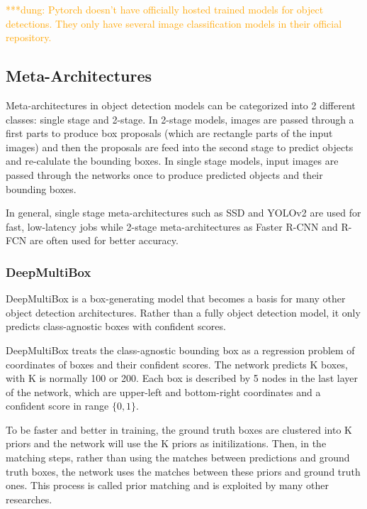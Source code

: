 \documentclass[conference]{IEEEtran}
\newcommand{\alnote}[1]{ {\textcolor{blue} { ***andre: #1 }}}
\newcommand{\dungnote}[1]{ {\textcolor{orange} { ***dung: #1 }}}
\newcommand{\alnote}[1]{}
\newcommand{\dungnote}[1]{}
\begin{document}
\dungnote{Pytorch doesn't have officially hosted trained models for object detections. They only have several image classification models in their official repository.}

\subsection{Meta-Architectures}


Meta-architectures in object detection models can be categorized into 2 different classes: single stage and 2-stage. In 2-stage models, images are passed through a first parts to produce box proposals (which are rectangle parts of the input images) and then the proposals are feed into the second stage to predict objects and re-calulate the bounding boxes. In single stage models, input images are passed through the networks once to produce predicted objects and their bounding boxes.

In general, single stage meta-architectures such as SSD and YOLOv2 are used for fast, low-latency jobs while 2-stage meta-architectures as Faster R-CNN and R-FCN are often used for better accuracy.

\subsubsection{DeepMultiBox}
DeepMultiBox is a box-generating model that becomes a basis for many other object detection architectures. Rather than a fully object detection model, it only predicts class-agnostic boxes with confident scores.

DeepMultiBox treats the class-agnostic bounding box as a regression problem of coordinates of boxes and their confident scores. The network predicts K boxes, with K is normally 100 or 200. Each box is described by 5 nodes in the last layer of the network, which are upper-left and bottom-right coordinates and a confident score in range $\{0, 1\}$.

To be faster and better in training, the ground truth boxes are clustered into K priors and the network will use the K priors as initilizations. Then, in the matching steps, rather than using the matches between predictions and ground truth boxes, the network uses the matches between these priors and ground truth ones. This process is called prior matching and is exploited by many other researches.
\end{document}
